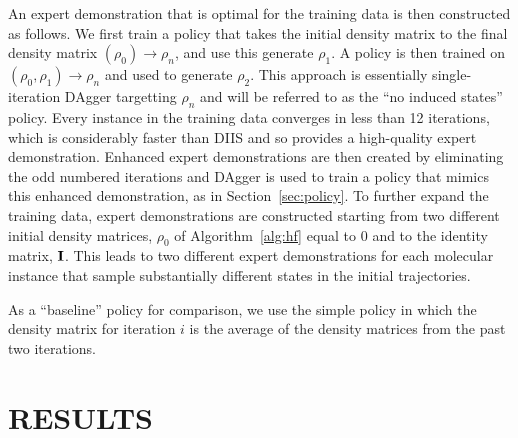 \documentclass[twoside,11pt]{article}
\begin{document}
An expert demonstration that is optimal for the training data is then constructed as follows. We first train a policy that takes the initial density matrix to the final density matrix $(\rho_0) \rightarrow \rho_n$, and use this generate $\rho_1$. A policy is then trained on $(\rho_0, \rho_1) \rightarrow \rho_n$ and used to generate $\rho_2$. This approach is essentially single-iteration DAgger targetting $\rho_n$ and will be referred to as the ``no induced states'' policy. Every instance in the training data converges in less than 12 iterations, which is considerably faster than DIIS\cite{Pulay1980} and so provides a high-quality expert demonstration. Enhanced expert demonstrations are then created by eliminating the odd numbered iterations and DAgger is used to train a policy that mimics this enhanced demonstration, as in Section~\ref{sec:policy}. To further expand the training data, expert demonstrations are constructed starting from two different initial density matrices, $\rho_0$ of Algorithm~\ref{alg:hf} equal to 0 and to the identity matrix, ${\bf I}$. This leads to two different expert demonstrations for each molecular instance that sample substantially different states in the initial trajectories. 

As a ``baseline'' policy for comparison, we use the simple policy in which the density matrix for iteration $i$ is the average of the density matrices from the past two iterations.

\section{RESULTS}
\end{document}
